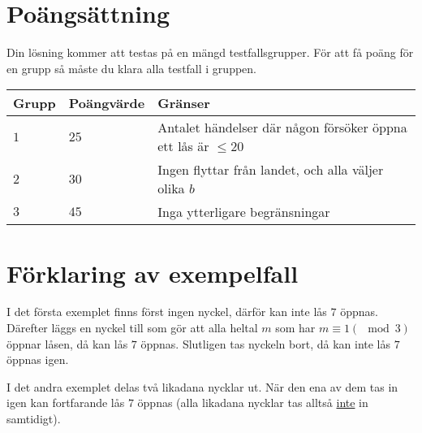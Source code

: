 \section*{Poängsättning}
Din lösning kommer att testas på en mängd testfallsgrupper.
För att få poäng för en grupp så måste du klara alla testfall i gruppen.

\noindent
\begin{tabular}{| l | l | l |}
\hline
Grupp & Poängvärde & Gränser \\ \hline
$1$    & $25$         & Antalet händelser där någon försöker öppna ett lås är $\leq 20$ \\ \hline
$2$    & $30$         & Ingen flyttar från landet, och alla väljer olika $b$ \\ \hline
$3$    & $45$         & Inga ytterligare begränsningar \\ \hline
\end{tabular}

\section*{Förklaring av exempelfall}
I det första exemplet finns först ingen nyckel, därför kan inte lås $7$ öppnas. Därefter läggs en nyckel till som gör att alla heltal $m$ som har $m\equiv 1 (\mod 3)$ öppnar låsen, då kan lås $7$ öppnas. Slutligen tas nyckeln bort, då kan inte lås $7$ öppnas igen.

I det andra exemplet delas två likadana nycklar ut. När den ena av dem tas in igen kan fortfarande lås $7$ öppnas (alla likadana nycklar tas alltså \underline{inte} in samtidigt).
